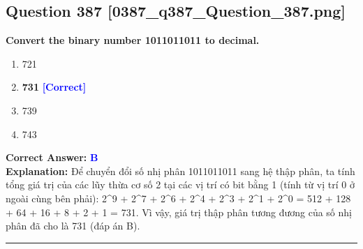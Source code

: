 \documentclass[11pt,a4paper]{article}
\begin{document}
\begin{minipage}{\textwidth}
\subsection*{Question 387 \quad \footnotesize{[0387\_q387\_Question\_387.png]}}
\noindent \textbf{Convert the binary number 1011011011 to decimal.}

\begin{enumerate}[label=\Alph*.]
    \item 721
    \item \textbf{731} \hfill \textcolor{blue}{\textbf{[Correct]}}
    \item 739
    \item 743
\end{enumerate}

\noindent \textbf{Correct Answer:} \textcolor{blue}{\textbf{B}} \\[2pt]
\noindent \textbf{Explanation:} Để chuyển đổi số nhị phân 1011011011 sang hệ thập phân, ta tính tổng giá trị của các lũy thừa cơ số 2 tại các vị trí có bit bằng 1 (tính từ vị trí 0 ở ngoài cùng bên phải): 2\textasciicircum{}9 + 2\textasciicircum{}7 + 2\textasciicircum{}6 + 2\textasciicircum{}4 + 2\textasciicircum{}3 + 2\textasciicircum{}1 + 2\textasciicircum{}0 = 512 + 128 + 64 + 16 + 8 + 2 + 1 = 731. Vì vậy, giá trị thập phân tương đương của số nhị phân đã cho là 731 (đáp án B).

\par\vspace{0.3cm}
\hrule
\vspace{0.3cm}
\end{minipage}
\end{document}
